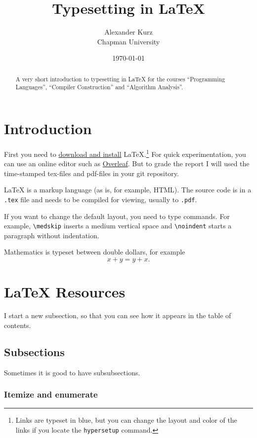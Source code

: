 \documentclass{article}
\title{Typesetting in LaTeX}
\author{Alexander Kurz  \\ Chapman University}
\date{\today}
\theoremstyle{plain}
\theoremstyle{definition}
\theoremstyle{remark}
\begin{document}
\maketitle

\begin{abstract}
A very short introduction to typesetting in LaTeX for the courses ``Programming Languages'', ``Compiler Construction'' and ``Algorithm Analysis''.
\end{abstract}

\tableofcontents

\section{Introduction}\label{intro}

First you need to \href{https://www.latex-project.org/get/}{download and install} LaTeX.\footnote{Links are typeset in blue, but you can change the layout and color of the links if you locate the  \texttt{hypersetup} command.}
%
For quick experimentation, you can use an online editor such as \href{https://www.overleaf.com/learn}{Overleaf}. But to grade the report I will used the time-stamped tex-files and pdf-files in your git repository.  

LaTeX is a markup language (as is, for example, HTML). The source code is in a \verb+.tex+ file and needs to be compiled for viewing, usually to \verb+.pdf+.

If you want to change the default layout, you need to type commands. For example, \verb+\medskip+ inserts a medium vertical space and \verb+\noindent+ starts a paragraph without indentation.
 
Mathematics is typeset between double dollars, for example $$x+y=y+x.$$

\section{LaTeX Resources}

I start a new subsection, so that you can see how it appears in the table of contents.

\subsection{Subsections}

Sometimes it is good to have subsubsections.

\subsubsection{Itemize and enumerate}
\end{document}
